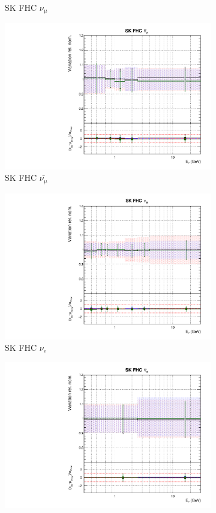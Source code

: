 \begin{figure}
\begin{subfigure}{0.45\textwidth}
  \caption{SK FHC $\nu_{\mu}$}
\end{subfigure}
\begin{subfigure}{0.45\textwidth}
  \centering
  \includegraphics[width=0.75\linewidth]{figs/polyasmvsflux_9}
  \caption{SK FHC $\bar{\nu_{\mu}}$}
\end{subfigure}
\begin{subfigure}{0.45\textwidth}
  \centering
  \includegraphics[width=0.75\linewidth]{figs/polyasmvsflux_10}
  \caption{SK FHC $\nu_{e}$}
\end{subfigure}
\begin{subfigure}{0.45\textwidth}
  \centering
  \includegraphics[width=0.75\linewidth]{figs/polyasmvsflux_11}

\end{subfigure}
\end{figure}
